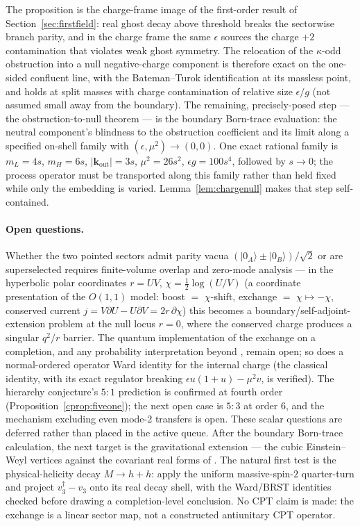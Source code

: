 \documentclass[11pt]{article}
\theoremstyle{definition}
\theoremstyle{remark}
\newcommand{\dg}{\dagger}
\begin{document}
The proposition is the charge-frame image of the first-order result of
Section~\ref{sec:firstfield}: real ghost decay above threshold breaks
the sectorwise branch parity, and in the charge frame the same
$\epsilon$ sources the charge $+2$ contamination that violates weak
ghost symmetry.  The relocation of the $\kappa$-odd obstruction into a
null negative-charge component is therefore exact on the one-sided
confluent line, with the Bateman--Turok identification at its massless
point, and holds at split masses with charge contamination of relative
size $\epsilon/g$ (not assumed small away from the boundary).  The
remaining, precisely-posed step --- the obstruction-to-null theorem ---
is the boundary Born-trace evaluation: the neutral component's
blindness to the obstruction coefficient and its limit along a
specified on-shell family with $(\epsilon,\mu^2)\to(0,0)$.
One exact rational family is
$m_L=4s$, $m_H=6s$, $|\mathbf k_{\mathrm{out}}|=3s$,
$\mu^2=26s^2$, $\epsilon g=100s^4$, followed by $s\to0$; the process
operator must be transported along this family rather than held fixed
while only the embedding is varied.
Lemma~\ref{lem:chargenull} makes that step self-contained.

\paragraph{Open questions.}
Whether the two pointed sectors admit parity vacua
$(|0_A\rangle\pm|0_B\rangle)/\sqrt2$ or are superselected requires
finite-volume overlap and zero-mode analysis --- in the hyperbolic
polar coordinates $r=UV$, $\chi=\tfrac12\log(U/V)$ (a coordinate
presentation of the $O(1,1)$ model: boost $=$ $\chi$-shift, exchange
$=$ $\chi\mapsto-\chi$, conserved current $j=V\partial U-U\partial V
=2r\,\partial\chi$) this becomes a boundary/self-adjoint-extension
problem at the null locus $r=0$, where the conserved charge produces a
singular $q^2/r$ barrier.  The quantum implementation of the exchange
on a completion, and any probability interpretation beyond
\cite{BT2026}, remain open; so does a normal-ordered operator Ward
identity for the internal charge (the classical identity, with its
exact regulator breaking $\epsilon u(1+u)-\mu^2v$, is verified).  The
hierarchy conjecture's $5{:}1$ prediction is confirmed at fourth order
(Proposition~\ref{cprop:fiveone}); the next open case is $5{:}3$ at
order 6, and the mechanism excluding even mode-2 transfers is open.
These scalar questions are deferred rather than placed in the active
queue.  After the boundary Born-trace calculation, the next target is
the gravitational extension --- the cubic Einstein--Weyl vertices
against the covariant real forms of \cite{paperIV}.  The natural first
test is the physical-helicity decay $M\to h+h$: apply the uniform
massive-spin-$2$ quarter-turn and project
$v_3^{\dg}-v_3$ onto its real decay shell, with the Ward/BRST identities
checked before drawing a completion-level conclusion.  No CPT claim is made: the
exchange is a linear sector map, not a constructed antiunitary CPT
operator.
\end{document}
